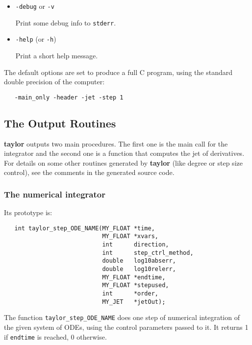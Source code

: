 \documentclass[10pt]{article}
\theoremstyle{remark}
\newcommand{\taylorname}{{\bf taylor}}
\begin{document}
\begin{itemize}
\item{\verb+-debug+ or \verb+-v+ 

Print some debug info to \verb+stderr+.}

\item{\verb+-help+ (or \verb+-h+)

Print a short help message.}

\end{itemize}

\noindent
The default options are set to produce a full C program, using the
standard double precision of the computer:
\begin{verbatim}
   -main_only -header -jet -step 1
\end{verbatim}

\subsection{The Output Routines}\label{sec:or}
\taylorname{} outputs two main procedures. The first one is the main
call for the integrator and the second one is a function that computes
the jet of derivatives. For details on some other routines generated
by \taylorname{} (like degree or step size control), see the comments
in the generated source code.

\subsubsection*{The numerical integrator}\label{sec:tnu}
Its prototype is:
\begin{verbatim}
   int taylor_step_ODE_NAME(MY_FLOAT *time,
                            MY_FLOAT *xvars,
                            int      direction,
                            int      step_ctrl_method,
                            double   log10abserr,
                            double   log10relerr,
                            MY_FLOAT *endtime,
                            MY_FLOAT *stepused,
                            int      *order,
                            MY_JET   *jetOut);
\end{verbatim}
The function \verb+taylor_step_ODE_NAME+ does one step of numerical
integration of the given system of ODEs, using the control parameters
passed to it. It returns 1 if \verb+endtime+ is reached, 0 otherwise.

\bigskip
\end{document}
